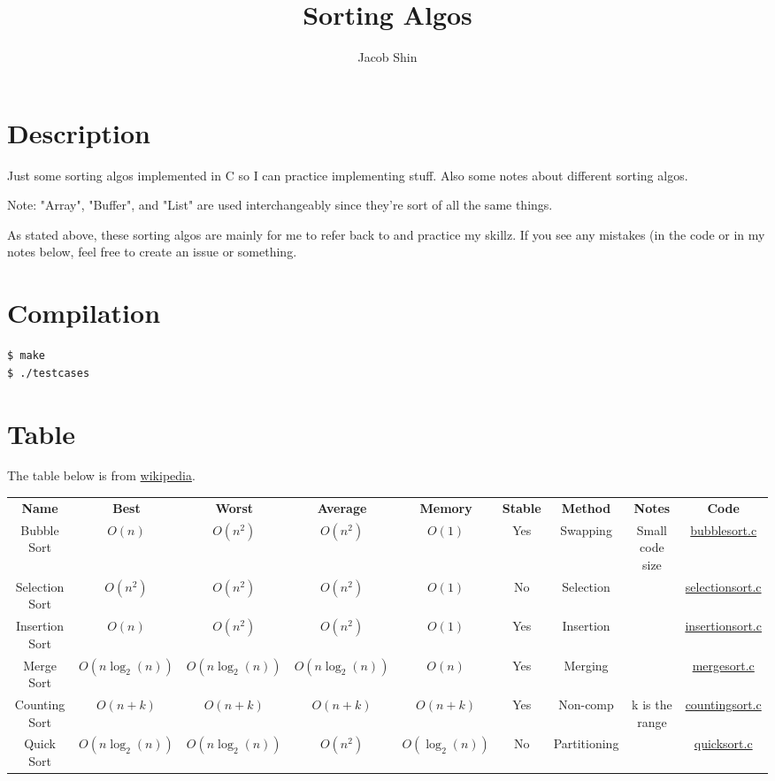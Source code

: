 \documentclass{article}
\title{Sorting Algos}
\author{Jacob Shin}
\date{}
\begin{document}
\maketitle
\section{Description}
Just some sorting algos implemented in C so I can practice implementing stuff. Also some notes about different sorting algos.

Note: "Array", "Buffer", and "List" are used interchangeably since they're sort of all the same things. \newline

As stated above, these sorting algos are mainly for me to refer back to and practice my skillz.
If you see any mistakes (in the code or in my notes below, feel free to create an issue or something.

\section{Compilation}

\begin{verbatim} 
$ make
$ ./testcases
\end{verbatim}

\section{Table}
The table below is from \href{https://en.wikipedia.org/wiki/Sorting_algorithm}{wikipedia}.
\begin{center}
    \begin{tabular}{ |c|c|c|c|c|c|c|c|c| }
    \hline
    \textbf{Name} & \textbf{Best} & \textbf{Worst} & \textbf{Average} & \textbf{Memory} & \textbf{Stable} & \textbf{Method} & \textbf{Notes} & \textbf{Code}\\
        Bubble Sort & $O(n)$ & $O(n^2)$ & $O(n^2)$ & $O(1)$ & Yes & Swapping & Small code size & \href{algos/bubblesort.c}{bubblesort.c} \\
        Selection Sort & $O(n^2)$ & $O(n^2)$ & $O(n^2)$ & $O(1)$ & No & Selection & & \href{algos/selectionsort.c}{selectionsort.c} \\
        Insertion Sort & $O(n)$ & $O(n^2)$ & $O(n^2)$ & $O(1)$ & Yes & Insertion & & \href{algos/insertionsort.c}{insertionsort.c} \\
        Merge Sort & $O(n \log_2(n))$ & $O(n \log_2(n))$ & $O(n \log_2(n)) $ & $O(n)$ & Yes & Merging & & \href{algos/mergesort.c}{mergesort.c} \\
        Counting Sort & $O(n + k)$ & $O(n + k)$ & $O(n + k) $ & $O(n + k)$ & Yes & Non-comp & k is the range & \href{algos/countingsort.c}{countingsort.c} \\
        Quick Sort & $O(n \log_2(n))$ & $O(n \log_2(n))$ & $O(n^2) $ & $O(\log_2(n))$ & No & Partitioning &   & \href{algos/quicksort.c}{quicksort.c} \\

    \hline
\end{tabular}
\end{center}
\end{document}
